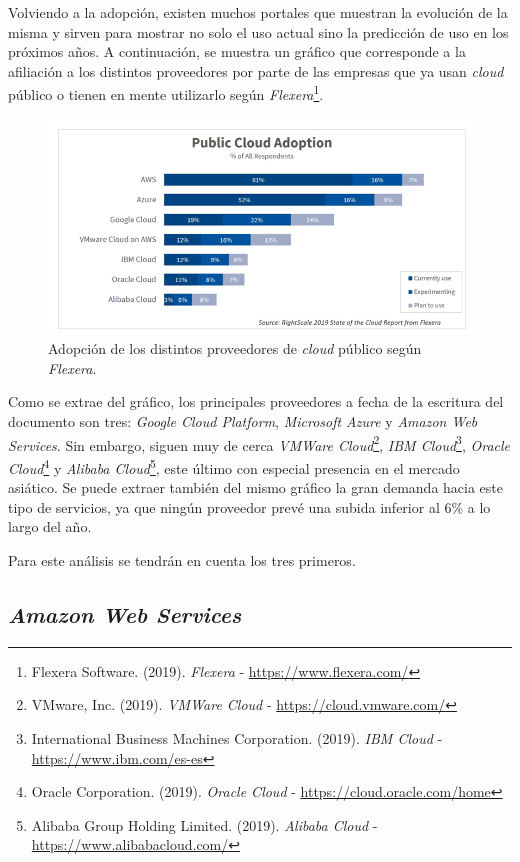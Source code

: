 \documentclass[11pt,spanish,listoffigures]{tfgetsinf}
\begin{document}
Volviendo a la adopción, existen muchos portales que muestran la evolución de la misma y sirven para mostrar no solo el uso actual sino la predicción de uso en los próximos años. A continuación, se muestra un gráfico que corresponde a la afiliación a los distintos proveedores por parte de las empresas que ya usan \textit{cloud} público o tienen en mente utilizarlo según \textit{Flexera}\footnote{Flexera Software. (2019). \textit{Flexera} - \url{https://www.flexera.com/}}.

\begin{figure}[h!]
  \centering
  \includegraphics[width=1\textwidth]{images/img01.png}
  \caption{Adopción de los distintos proveedores de \textit{cloud} público según \textit{Flexera}.}
\end{figure}

Como se extrae del gráfico, los principales proveedores a fecha de la escritura del documento son tres: \textit{Google Cloud Platform}, \textit{Microsoft Azure} y \textit{Amazon Web Services}. Sin embargo, siguen muy de cerca \textit{VMWare Cloud}\footnote{ VMware, Inc. (2019). \textit{VMWare Cloud} - \url{https://cloud.vmware.com/}}, \textit{IBM Cloud}\footnote{International Business Machines Corporation. (2019). \textit{IBM Cloud} - \url{https://www.ibm.com/es-es}}, \textit{Oracle Cloud}\footnote{Oracle Corporation. (2019). \textit{Oracle Cloud} - \url{https://cloud.oracle.com/home}} y \textit{Alibaba Cloud}\footnote{Alibaba Group Holding Limited. (2019). \textit{Alibaba Cloud} - \url{https://www.alibabacloud.com/}}, este último con especial presencia en el mercado asiático. Se puede extraer también del mismo gráfico la gran demanda hacia este tipo de servicios, ya que ningún proveedor prevé una subida inferior al 6\% a lo largo del año. 

Para este análisis se tendrán en cuenta los tres primeros.

\subsection{\textit{Amazon Web Services}}
\label{sec:amazon-web-services}
\end{document}
